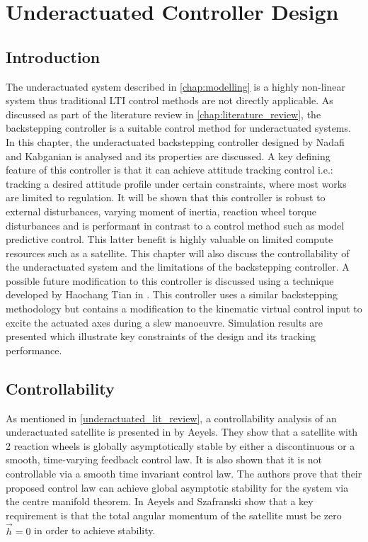 \chapter{Underactuated Controller Design}
\label{chap:underactuated_controller}

\section{Introduction}
The underactuated system described in \autoref{chap:modelling} is a highly non-linear system thus traditional LTI control methods are not directly applicable. As discussed as part of the literature review in \autoref{chap:literature_review}, the backstepping controller is a suitable control method for underactuated systems. In this chapter, the underactuated backstepping controller designed by Nadafi and Kabganian \cite{nadafiRobustBacksteppingAttitude2021} is analysed and its properties are discussed. A key defining feature of this controller is that it can achieve attitude tracking control i.e.: tracking a desired attitude profile under certain constraints, where most works are limited to regulation. It will be shown that this controller is robust to external disturbances, varying moment of inertia, reaction wheel torque disturbances and is performant in contrast to a control method such as model predictive control. This latter benefit is highly valuable on limited compute resources such as a satellite. This chapter will also discuss the controllability of the underactuated system and the limitations of the backstepping controller. A possible future modification to this controller is discussed using a technique developed by Haochang Tian in \cite{tianUnderactuatedTethered}. This controller uses a similar backstepping methodology but contains a modification to the kinematic virtual control input to excite the actuated axes during a slew manoeuvre. Simulation results are presented which illustrate key constraints of the design and its tracking performance.

\section{Controllability}
\label{sec:controllability}
As mentioned in \autoref{underactuated_lit_review}, a controllability analysis of an underactuated satellite is presented in \cite{aeyelsStabilizationNonLinear} by Aeyels. They show that a satellite with 2 reaction wheels is globally asymptotically stable by either a discontinuous or a smooth, time-varying feedback control law. It is also shown that it is not controllable via a smooth time invariant control law. The authors prove that their proposed control law can achieve global asymptotic stability for the system via the centre manifold theorem. In \cite{aeyelsComments} Aeyels and Szafranski show that a key requirement is that the total angular momentum of the satellite must be zero $\vec{h} = 0$ in order to achieve stability. 

